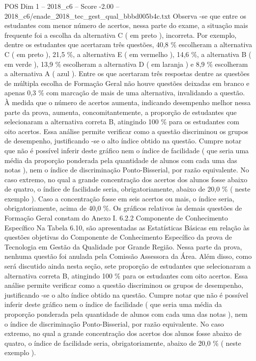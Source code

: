 \begin{textsample}{POS Dim 1 – 2018\_c6 – Score -2.00 – 2018\_c6/enade\_2018\_tec\_gest\_qual\_bbbd005b4c.txt}
Observa -se que entre os estudantes com menor número de acertos, nessa parte do exame, a situação mais frequente foi a escolha da alternativa C ( em preto ), incorreta.
Por exemplo, dentre os estudantes que acertaram três questões, 40,8 \% escolheram a alternativa C ( em preto ), 21,5 \%, a alternativa E ( em vermelho ), 14,6 \%, a alternativa B ( em verde ), 13,9 \% escolheram a alternativa D ( em laranja ) e 8,9 \% escolheram a alternativa A ( azul ).
Entre os que acertaram três respostas dentre as questões de múltipla escolha de Formação Geral não houve questões deixadas em branco e apenas 0,3 \% com marcação de mais de uma alternativa, invalidando a questão.
À medida que o número de acertos aumenta, indicando desempenho melhor nessa parte da prova, aumenta, concomitantemente, a proporção de estudantes que selecionaram a alternativa correta B, atingindo 100 \% para os estudantes com oito acertos.
Essa análise permite verificar como a questão discriminou os grupos de desempenho, justificando -se o alto índice obtido na questão.
Cumpre notar que não é possível inferir deste gráfico nem o índice de facilidade ( que seria uma média da proporção ponderada pela quantidade de alunos com cada uma das notas ), nem o índice de discriminação Ponto-Bisserial, por razão equivalente.
No caso extremo, no qual a grande concentração dos acertos dos alunos fosse abaixo de quatro, o índice de facilidade seria, obrigatoriamente, abaixo de 20,0 \% ( neste exemplo ).
Caso a concentração fosse em seis acertos ou mais, o índice seria, obrigatoriamente, acima de 40,0 \%.
Os gráficos relativos às demais questões de Formação Geral constam do Anexo I. 6.2.2 Componente de Conhecimento Específico Na Tabela 6.10, são apresentadas as Estatísticas Básicas em relação às questões objetivas do Componente de Conhecimento Específico da prova de Tecnologia em Gestão da Qualidade por Grande Região.
Nessa parte da prova, nenhuma questão foi anulada pela Comissão Assessora da Área.
Além disso, como será discutido ainda nesta seção, sete proporção de estudantes que selecionaram a alternativa correta B, atingindo 100 \% para os estudantes com oito acertos.
Essa análise permite verificar como a questão discriminou os grupos de desempenho, justificando -se o alto índice obtido na questão.
Cumpre notar que não é possível inferir deste gráfico nem o índice de facilidade ( que seria uma média da proporção ponderada pela quantidade de alunos com cada uma das notas ), nem o índice de discriminação Ponto-Bisserial, por razão equivalente.
No caso extremo, no qual a grande concentração dos acertos dos alunos fosse abaixo de quatro, o índice de facilidade seria, obrigatoriamente, abaixo de 20,0 \% ( neste exemplo ).

\end{textsample}

